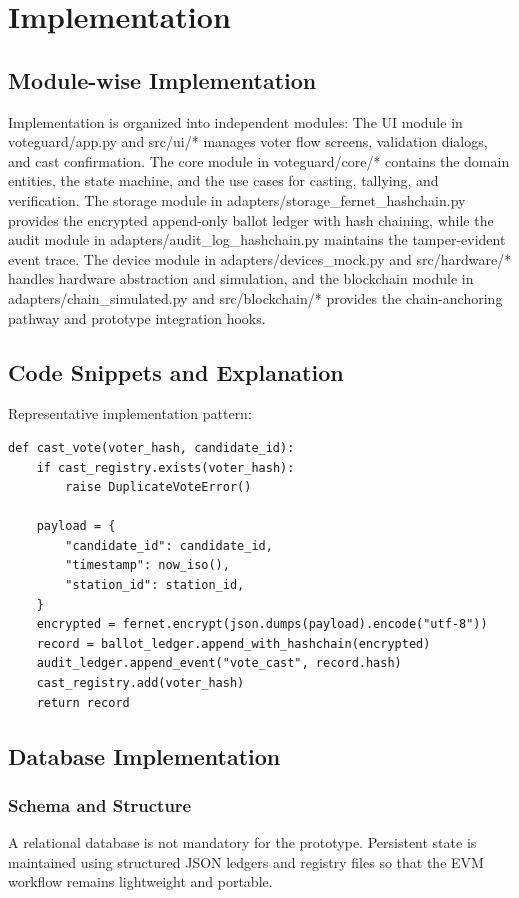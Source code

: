 \chapter{Implementation}

\section{Module-wise Implementation}
Implementation is organized into independent modules:
The UI module in voteguard/app.py and src/ui/* manages voter flow screens, validation dialogs, and cast confirmation. The core module in voteguard/core/* contains the domain entities, the state machine, and the use cases for casting, tallying, and verification. The storage module in adapters/storage_fernet_hashchain.py provides the encrypted append-only ballot ledger with hash chaining, while the audit module in adapters/audit_log_hashchain.py maintains the tamper-evident event trace. The device module in adapters/devices_mock.py and src/hardware/* handles hardware abstraction and simulation, and the blockchain module in adapters/chain_simulated.py and src/blockchain/* provides the chain-anchoring pathway and prototype integration hooks.

\section{Code Snippets and Explanation}
Representative implementation pattern:
\begin{verbatim}
def cast_vote(voter_hash, candidate_id):
    if cast_registry.exists(voter_hash):
        raise DuplicateVoteError()

    payload = {
        "candidate_id": candidate_id,
        "timestamp": now_iso(),
        "station_id": station_id,
    }
    encrypted = fernet.encrypt(json.dumps(payload).encode("utf-8"))
    record = ballot_ledger.append_with_hashchain(encrypted)
    audit_ledger.append_event("vote_cast", record.hash)
    cast_registry.add(voter_hash)
    return record
\end{verbatim}

\section{Database Implementation}

\subsection{Schema and Structure}
A relational database is not mandatory for the prototype. Persistent state is maintained using structured JSON ledgers and registry files so that the EVM workflow remains lightweight and portable.

